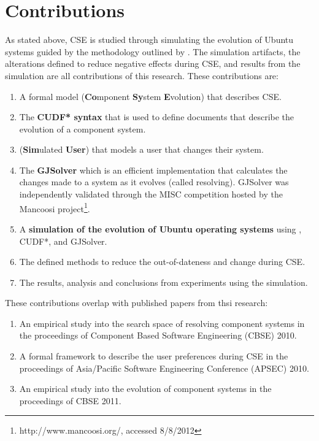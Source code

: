 \section{Contributions}
As stated above, CSE is studied through simulating the evolution of Ubuntu systems guided by the methodology outlined by \cite{Law2005}.
The simulation artifacts, the alterations defined to reduce negative effects during CSE, 
and results from the simulation are all contributions of this research. 
These contributions are:
\begin{enumerate}
  \item A formal model \textbf{\modelname} (\textbf{Co}mponent \textbf{Sy}stem \textbf{E}volution) that describes CSE. 
  \item The \textbf{CUDF* syntax} that is used to define documents that describe the evolution of a component system.
  \item \textbf{\usermodel} (\textbf{Sim}ulated \textbf{User}) that models a user that changes their system.
  \item The \textbf{GJSolver} which is an efficient implementation that calculates the changes made to a system as it evolves (called resolving).
	GJSolver was independently validated through the MISC competition hosted by the Mancoosi project\footnote{http://www.mancoosi.org/, accessed 8/8/2012}. 
  \item A \textbf{simulation of the evolution of Ubuntu operating systems} using \modelname, CUDF*, \usermodel and GJSolver.
  \item The defined methods to reduce the out-of-dateness and change during CSE. 
  \item The results, analysis and conclusions from experiments using the simulation.
\end{enumerate}

These contributions overlap with published papers from thsi research:
\begin{enumerate}
  \item An empirical study into the search space of resolving component systems \citep{Jenson2010} in the proceedings of Component Based Software Engineering (CBSE) 2010.
  \item A formal framework to describe the user preferences during CSE \citep{Jenson2010a} in the proceedings of Asia/Pacific Software Engineering Conference (APSEC) 2010.
  \item An empirical study into the evolution of component systems \citep{jenson2011} in the proceedings of CBSE 2011.
\end{enumerate}

